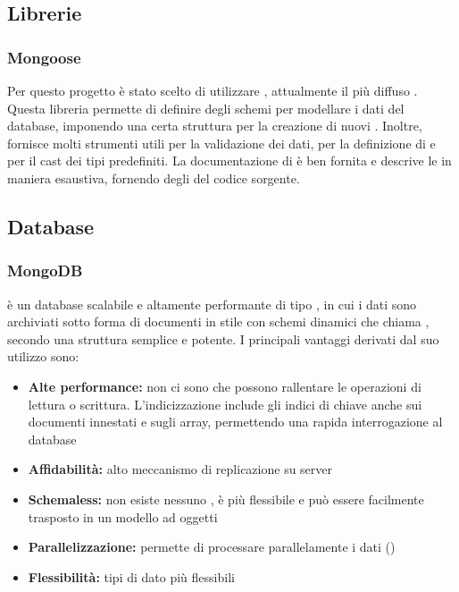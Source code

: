 \documentclass[12pt,a4paper]{article}
\begin{document}
\subsection{Librerie}\label{librery}
\subsubsection{Mongoose}\label{mongoose}
Per questo progetto è stato scelto di utilizzare , attualmente il più diffuso . Questa libreria permette di definire degli schemi per modellare i dati del database, imponendo una certa struttura per la creazione di nuovi . Inoltre, fornisce molti strumenti utili per la validazione dei dati, per la definizione di  e per il cast dei tipi predefiniti.
La documentazione di  è ben fornita e descrive le  in maniera esaustiva, fornendo degli  del codice sorgente.

\subsection{Database}
\subsubsection{MongoDB}\label{mongodb}
 è un database   scalabile e altamente performante di tipo , in cui i dati sono archiviati sotto forma di documenti in stile  con schemi dinamici che  chiama , secondo una struttura semplice e potente. I principali vantaggi derivati dal suo utilizzo sono:

\begin{itemize}
	\item \textbf{Alte performance:} non ci sono  che possono rallentare le operazioni di lettura o scrittura. L’indicizzazione include gli indici di chiave anche sui documenti innestati e sugli array, permettendo una rapida interrogazione al database
	\item \textbf{Affidabilità:} alto meccanismo di replicazione su server
	\item \textbf{Schemaless:} non esiste nessuno , è più flessibile e può essere facilmente trasposto in un modello ad oggetti
	\item \textbf{Parallelizzazione:} permette di processare parallelamente i dati ()
	\item \textbf{Flessibilità:} tipi di dato più flessibili
\end{itemize}
\end{document}
